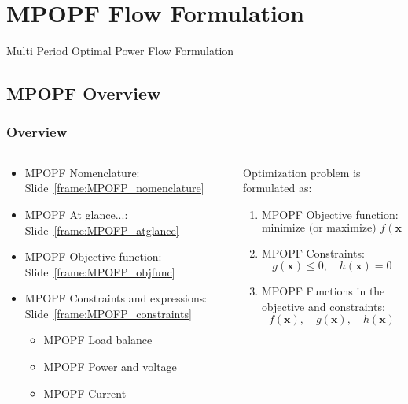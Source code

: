 \documentclass[
	11pt, %
	aspectratio=169, %
]{beamer}
\begin{document}

\section{MPOPF Flow Formulation} %

\begin{frame}
    \centering
    \LARGE
    Multi Period Optimal Power Flow Formulation
\end{frame}


\subsection{MPOPF Overview}

\begin{frame}
	\frametitle{Overview}
	
	\begin{columns}
		\begin{column}{0.5\textwidth}
			\begin{itemize}
				\item MPOPF Nomenclature: Slide~\ref{frame:MPOFP_nomenclature}
				\item MPOPF At glance...: Slide~\ref{frame:MPOFP_atglance}
				\item MPOPF Objective function: Slide~\ref{frame:MPOFP_objfunc}
				\item MPOPF Constraints and expressions: Slide~\ref{frame:MPOFP_constraints}
					\begin{itemize}
						\item MPOPF Load balance
						\item MPOPF Power and voltage
						\item MPOPF Current
					\end{itemize}
			\end{itemize}
		\end{column}

		\begin{column}{0.5\textwidth}
			Optimization problem is formulated as:
			\begin{enumerate}
				\item MPOPF Objective function:
				\[
					\text{minimize (or maximize) } f(\mathbf{x})
				\]
				\item MPOPF Constraints:
				\[
					g(\mathbf{x}) \leq 0, \quad h(\mathbf{x}) = 0
				\]
				\item MPOPF Functions in the objective and constraints:
				\[
					f(\mathbf{x}), \quad g(\mathbf{x}), \quad h(\mathbf{x})
				\]
			\end{enumerate}
		\end{column}
	\end{columns}
\end{frame}
\end{document}
